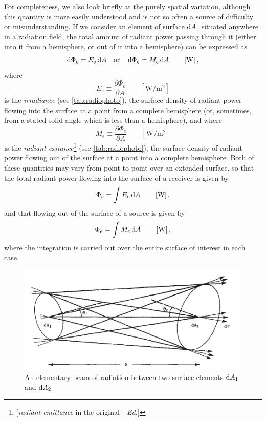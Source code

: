 \begin{refsection}
For completeness, we also look briefly at the purely spatial variation, although
this quantity is more easily understood and is not so often a source of
difficulty
or misunderstanding. If we consider an element of surface $\mathop{}\!\mathrm{d} A$, situated
anywhere
in a radiation field, the total amount of radiant power passing through it
(either
into it from a hemisphere, or out of it into a hemisphere) can be expressed as
\begin{equation*}
\d\Phi_e = E_e \d A \quad \textrm{or} \quad \d\Phi_e = M_e \d A
\qquad \left[\unit{\watt}\right],
\end{equation*}
where
\begin{equation}\label{eqn:nicodemus4}
E_e \equiv \frac{\partial \Phi_e}{\partial A}
\qquad \left[\unit{\watt\per\square\meter}\right]
\end{equation}
is the \textsl{irradiance} (see \cref{tab:radiophoto}), the surface density
of radiant power flowing into the surface at a point from a complete hemisphere
(or, sometimes, from a stated solid angle which is less than a hemisphere), and
where
\begin{equation}\label{eqn:nicodemus5}
M_e \equiv \frac{\partial \Phi_e}{\partial A}
\qquad \left[\unit{\watt\per\square\meter}\right]
\end{equation}
is the \textsl{radiant exitance}\footnote{[\textsl{radiant emittance} in the original---\textit{Ed.}]} (see \cref{tab:radiophoto}), the surface
density of radiant power flowing out of the surface at a point into a complete
hemisphere. Both of these quantities may vary from point to point over an
extended
surface, so that the total radiant power flowing into the surface of a receiver
is given by
\begin{equation}
\Phi_e = \int E_e \d A
\qquad \left[\unit{\watt}\right],
\end{equation}
and that flowing out of the surface of a source is given by
\begin{equation}
\Phi_e = \int M_e \d A
\qquad \left[\unit{\watt}\right],
\end{equation}
where the integration is carried out over the entire surface of interest in each case.

\begin{figure}
\begin{center}
\includegraphics{figures/nicodemus1963-fig2.pdf}
\end{center}
\caption{An elementary beam of radiation between two surface elements $\mathop{}\!\mathrm{d} A_1$ and $\mathop{}\!\mathrm{d} A_2$}
\label{fig:nicodemus2}
\end{figure}


\end{refsection}
